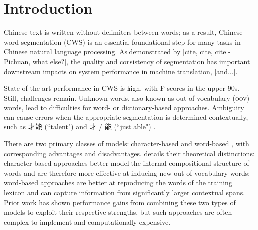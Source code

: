 \section{Introduction}

Chinese text is written without delimiters between words; as a result, Chinese word segmentation (CWS) is an essential foundational step for many tasks in Chinese natural language processing. As demonstrated by [cite, cite, cite - Pichuan, what else?], the quality and consistency of segmentation has important downstream impacts on system performance in machine translation, [and...].

State-of-the-art performance in CWS is high, with F-scores in the upper 90s. %
Still, challenges remain. Unknown words, also known as out-of-vocabulary (\textsc{oov}) words, lead to difficulties for word- or dictionary-based approaches.
Ambiguity can cause errors when the appropriate segmentation is determined contextually, such as 才能 (``talent") and 才 / 能 (``just able") \cite{Gao:2003:ACL}.

There are two primary classes of models: character-based \cite{Xue:2003:IJCLCLP,Tseng:2005:SIGHAN,Zhang:2006:HLT-NAACL,Wang:2010:COLING} and word-based \cite{Andrew:2006:EMNLP,Zhang:2007:ACL}, with corresponding advantages and disadvantages. \cite{Sun:2010:COLING} details their theoretical distinctions: character-based approaches better model the internal compositional structure of words and are therefore more effective at inducing new out-of-vocabulary words; word-based approaches are better at reproducing the words of the training lexicon and can capture information from significantly larger contextual spans. Prior work has shown performance gains from combining these two types of models to exploit their respective strengths, but such approaches are often complex to implement and computationally expensive.


